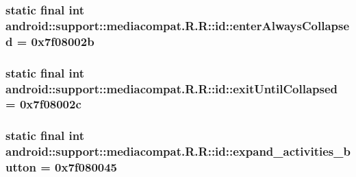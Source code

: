 \hypertarget{classandroid_1_1support_1_1mediacompat_1_1_r_1_1id_32ca60c27986f319e4974a841d11bf10}{
\subsubsection[{enterAlwaysCollapsed}]{\setlength{\rightskip}{0pt plus 5cm}static final int android::support::mediacompat.R.R::id::enterAlwaysCollapsed = 0x7f08002b}}
\label{classandroid_1_1support_1_1mediacompat_1_1_r_1_1id_32ca60c27986f319e4974a841d11bf10}


\hypertarget{classandroid_1_1support_1_1mediacompat_1_1_r_1_1id_801d99cd64df92b08fd07a47b55523bd}{
\subsubsection[{exitUntilCollapsed}]{\setlength{\rightskip}{0pt plus 5cm}static final int android::support::mediacompat.R.R::id::exitUntilCollapsed = 0x7f08002c}}
\label{classandroid_1_1support_1_1mediacompat_1_1_r_1_1id_801d99cd64df92b08fd07a47b55523bd}


\hypertarget{classandroid_1_1support_1_1mediacompat_1_1_r_1_1id_5663d02250477231adaf37d01d424e4c}{
\subsubsection[{expand\_\-activities\_\-button}]{\setlength{\rightskip}{0pt plus 5cm}static final int android::support::mediacompat.R.R::id::expand\_\-activities\_\-button = 0x7f080045}}
\label{classandroid_1_1support_1_1mediacompat_1_1_r_1_1id_5663d02250477231adaf37d01d424e4c}


